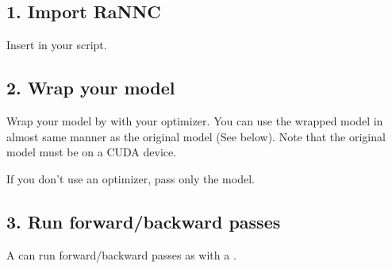 \documentclass[letterpaper,10pt,english]{sphinxmanual}
\begin{document}
\subsection{1. Import RaNNC}
\label{\detokenize{tutorial:import-rannc}}
Insert  in your script.

\begin{sphinxVerbatim}[commandchars=\\\{\}]
 
\end{sphinxVerbatim}


\subsection{2. Wrap your model}
\label{\detokenize{tutorial:wrap-your-model}}
Wrap your model by  with your optimizer.
You can use the wrapped model in almost same manner as the original model (See below).
Note that the original model must be on a CUDA device.

\begin{sphinxVerbatim}[commandchars=\\\{\}]
  
   
   
\end{sphinxVerbatim}

If you don’t use an optimizer, pass only the model.

\begin{sphinxVerbatim}[commandchars=\\\{\}]
  
\end{sphinxVerbatim}


\subsection{3. Run forward/backward passes}
\label{\detokenize{tutorial:run-forward-backward-passes}}
A  can run forward/backward passes as with a .
\end{document}

